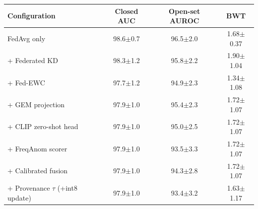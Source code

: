 \begin{tabular}{@{}lccc@{}}
\toprule
Configuration & Closed AUC & Open-set AUROC & BWT \\
\midrule
FedAvg only & 98.6$\pm$0.7 & 96.5$\pm$2.0 & 1.68$\pm$0.37 \\
+ Federated KD & 98.3$\pm$1.2 & 95.8$\pm$2.2 & 1.90$\pm$1.04 \\
+ Fed-EWC & 97.7$\pm$1.2 & 94.9$\pm$2.3 & 1.34$\pm$1.08 \\
+ GEM projection & 97.9$\pm$1.0 & 95.4$\pm$2.3 & 1.72$\pm$1.07 \\
+ CLIP zero-shot head & 97.9$\pm$1.0 & 95.0$\pm$2.5 & 1.72$\pm$1.07 \\
+ FreqAnom scorer & 97.9$\pm$1.0 & 93.5$\pm$3.3 & 1.72$\pm$1.07 \\
+ Calibrated fusion & 97.9$\pm$1.0 & 94.3$\pm$2.8 & 1.72$\pm$1.07 \\
+ Provenance $\tau$ (+int8 update) & 97.9$\pm$1.0 & 93.4$\pm$3.2 & 1.63$\pm$1.17 \\
\bottomrule
\end{tabular}
